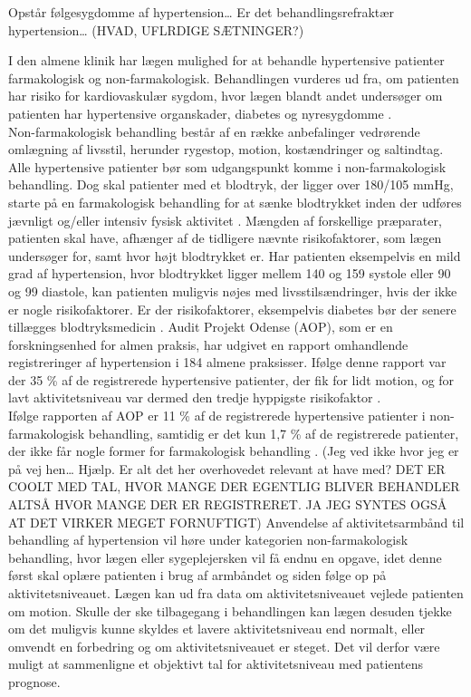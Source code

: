 Opstår følgesygdomme af hypertension… Er det behandlingsrefraktær hypertension… (HVAD, UFLRDIGE SÆTNINGER?)


I den almene klinik har lægen mulighed for at behandle hypertensive patienter farmakologisk og non-farmakologisk. Behandlingen vurderes ud fra, om patienten har risiko for kardiovaskulær sygdom, hvor lægen blandt andet undersøger om patienten har hypertensive organskader, diabetes og nyresygdomme \citep{promedicin2016}. \\
Non-farmakologisk behandling består af en række anbefalinger vedrørende omlægning af livsstil, herunder rygestop, motion, kostændringer og saltindtag. Alle hypertensive patienter bør som udgangspunkt komme i non-farmakologisk behandling. Dog skal patienter med et blodtryk, der ligger over 180/105 mmHg, starte på en farmakologisk behandling for at sænke blodtrykket inden der udføres jævnligt og/eller intensiv fysisk aktivitet \citep{pedersen2016}.
Mængden af forskellige præparater, patienten skal have, afhænger af de tidligere nævnte risikofaktorer, som lægen undersøger for, samt hvor højt blodtrykket er. Har patienten eksempelvis en mild grad af hypertension, hvor blodtrykket ligger mellem 140 og 159 systole eller 90 og 99 diastole, kan patienten muligvis nøjes med livsstilsændringer, hvis der ikke er nogle risikofaktorer. Er der risikofaktorer, eksempelvis diabetes bør der senere tillægges blodtryksmedicin \citep{bech2015}. Audit Projekt Odense (AOP), som er en forskningsenhed for almen praksis, har udgivet en rapport omhandlende registreringer af hypertension i 184 almene praksisser. Ifølge denne rapport var der 35 \% af de registrerede hypertensive patienter, der fik for lidt motion, og for lavt aktivitetsniveau var dermed den tredje hyppigste risikofaktor \citep{munch2007}. \\
Ifølge rapporten af AOP er 11 \% af de registrerede hypertensive patienter i non-farmakologisk behandling, samtidig er det kun 1,7 \% af de registrerede patienter, der ikke får nogle former for farmakologisk behandling \citep{munch2007}.
 (Jeg ved ikke hvor jeg er på vej hen… Hjælp. Er alt det her overhovedet relevant at have med? DET ER COOLT MED TAL, HVOR MANGE DER EGENTLIG BLIVER BEHANDLER ALTSÅ HVOR MANGE DER ER REGISTRERET. JA JEG SYNTES OGSÅ AT DET VIRKER MEGET FORNUFTIGT)
Anvendelse af aktivitetsarmbånd til behandling af hypertension vil høre under kategorien non-farmakologisk behandling, hvor lægen eller sygeplejersken vil få endnu en opgave, idet denne først skal oplære patienten i brug af armbåndet og siden følge op på aktivitetsniveauet. Lægen kan ud fra data om aktivitetsniveauet vejlede patienten om motion. Skulle der ske tilbagegang i behandlingen kan lægen desuden tjekke om det muligvis kunne skyldes et lavere aktivitetsniveau end normalt, eller omvendt en forbedring og om aktivitetsniveauet er steget. Det vil derfor være muligt at sammenligne et objektivt tal for aktivitetsniveau med patientens prognose. 

